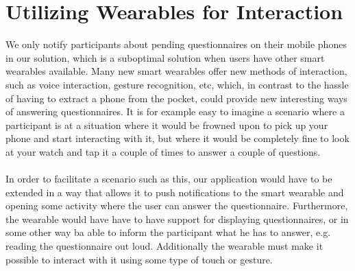
\section{Utilizing Wearables for Interaction}
\label{sec:utilizing_wearables_for_interaction}

We only notify participants about pending questionnaires on their mobile phones in our solution, which is a suboptimal solution when users have other smart wearables available. Many new smart wearables offer new methods of interaction, such as voice interaction, gesture recognition, etc, which, in contrast to the hassle of having to extract a phone from the pocket, could provide new interesting ways of answering questionnaires. It is for example easy to imagine a scenario where a participant is at a situation where it would be frowned upon to pick up your phone and start interacting with it, but where it would be completely fine to look at your watch and tap it a couple of times to answer a couple of questions. 
\\\\
In order to facilitate a scenario such as this, our application would have to be extended in a way that allows it to push notifications to the smart wearable and opening some activity where the user can answer the questionnaire. Furthermore, the wearable would have have to have support for displaying questionnaires, or in some other way ba able to inform the participant what he has to answer, e.g. reading the questionnaire out loud. Additionally the wearable must make it possible to interact with it using some type of touch or gesture. 